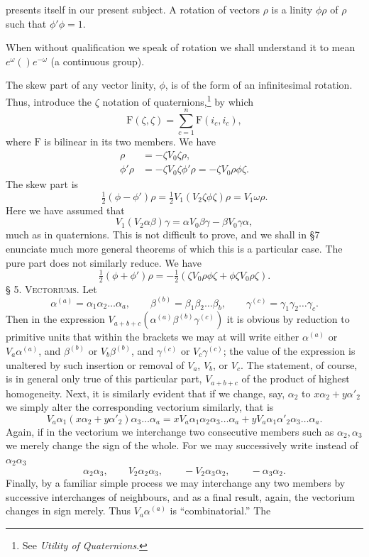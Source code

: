 \documentclass[11pt]{article}
\begin{document}
presents itself in our present subject. A rotation of vectors $\rho$ is a linity $\phi\rho$ of $\rho$ such that $\phi'\phi=1$.

\indent When without qualification we speak of rotation we shall understand it to mean $e^\omega()e^{-\omega}$ (a continuous group).

\indent The skew part of any vector linity, $\phi$, is of the form of an infinitesimal rotation. Thus, introduce the $\zeta$ notation of quaternions,\footnote{See \emph{Utility of Quaternions}.} by which
\begin{equation}\mathrm F(\zeta,\zeta)=\sum_{c=1}^n\mathrm F(i_c,i_c),\tag{7}\end{equation}
where $\mathrm F$ is bilinear in its two members. We have
\begin{align}\rho&=-\zeta V_0\zeta\rho,\tag{8}\\\phi'\rho&=-\zeta V_0\zeta\phi'\rho=-\zeta V_0\rho\phi\zeta.\tag{9}\end{align}
The skew part is
\begin{equation}\tfrac12(\phi-\phi')\rho=\tfrac12V_1(V_2\zeta\phi\zeta)\rho=V_1\omega\rho.\tag{10}\end{equation}
Here we have assumed that
\[V_1(V_2\alpha\beta)\gamma=\alpha V_0\beta\gamma-\beta V_0\gamma\alpha,\]
much as in quaternions. This is not difficult to prove, and we shall in §7 enunciate much more general theorems of which this is a particular case. The pure part does not similarly reduce. We have
\begin{equation}\tfrac12(\phi+\phi')\rho=-\tfrac12(\zeta V_0\rho\phi\zeta+\phi\zeta V_0\rho\zeta).\tag{11}\end{equation}
\noindent\textsc{§ 5. Vectoriums.} Let
\[\alpha^{(a)}=\alpha_1\alpha_2\ldots\alpha_a,\qquad\beta^{(b)}=\beta_1\beta_2\ldots\beta_b,\qquad\gamma^{(c)}=\gamma_1\gamma_2\ldots\gamma_c.\]
Then in the expression $V_{a+b+c}(\alpha^{(a)}\beta^{(b)}\gamma^{(c)})$ it is obvious by reduction to primitive units that within the brackets we may at will write either $\alpha^{(a)}$ or $V_a\alpha^{(a)}$, and $\beta^{(b)}$ or $V_b\beta^{(b)}$, and $\gamma^{(c)}$ or $V_c\gamma^{(c)}$; the value of the expression is unaltered by such insertion or removal of $V_a$, $V_b$, or $V_c$. The statement, of course, is in general only true of this particular part, $V_{a+b+c}$ of the product of highest homogeneity. Next, it is similarly evident that if we change, say, $\alpha_2$ to $x\alpha_2+y\alpha'_2$ we simply alter the corresponding vectorium similarly, that is
\[V_a\alpha_1(x\alpha_2+y\alpha'_2)\alpha_3\ldots\alpha_a=xV_a\alpha_1\alpha_2\alpha_3\ldots\alpha_a+yV_a\alpha_1\alpha'_2\alpha_3\ldots\alpha_a.\]
Again, if in the vectorium we interchange two consecutive members such as $\alpha_2,\alpha_3$ we merely change the sign of the whole. For we may successively write instead of $\alpha_2\alpha_3$
\[\alpha_2\alpha_3,\qquad V_2\alpha_2\alpha_3,\qquad-V_2\alpha_3\alpha_2,\qquad-\alpha_3\alpha_2.\]
Finally, by a familiar simple process we may interchange any two members by successive interchanges of neighbours, and as a final result, again, the vectorium changes in sign merely. Thus $V_a\alpha^{(a)}$ is ``combinatorial.'' The
\end{document}

